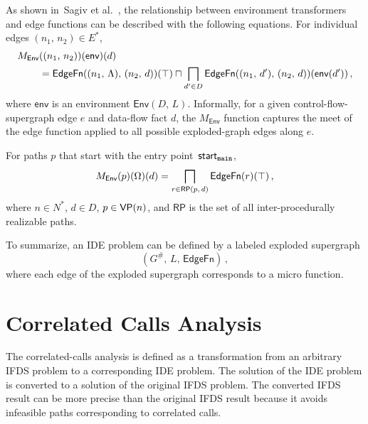 As shown in~Sagiv et al.~\cite{sagiv1996precise}, the relationship between environment transformers and edge functions can be described with the following equations. For individual edges $(n_1,\,n_2)\in E^*$,
\begin{align}\label{eq:envTransToEdgeFnEdge}
  M_\textsf{Env}&((n_1,\,n_2))(\textsf{env})(d)\notag\\
  &=\textsf{EdgeFn}((n_1,\,\Lambda),\,(n_2,\,d))(\top)\sqcap\bigsqcap_{d'\in D}\textsf{EdgeFn}((n_1,\,d'),\,(n_2,\,d))(\textsf{env}(d'))\,,
\end{align}
where $\textsf{env}$ is an environment $\textsf{Env}(D,\,L)$. Informally, for a given control-flow-supergraph edge $e$ and data-flow fact $d$, the $M_\textsf{Env}$ function captures the meet of the edge function applied to all possible exploded-graph edges along $e$.

For paths $p$ that start with the entry point~$\textsf{start}_\texttt{main}$,
\begin{equation}\label{eq:envTransToEdgefn}
  M_\textsf{Env}(p)(\Omega)(d)=\bigsqcap_{r\in\mathsf{RP}(p,\,d)}\textsf{EdgeFn}(r)(\top)\,,
\end{equation}
where $n\in N^*$, $d\in D$, $p\in\textsf{VP}(n)$, and $\mathsf{RP}$ is the set of all inter-procedurally realizable paths.

To summarize, an IDE problem can be defined by a labeled exploded supergraph 
\begin{equation}(G^\#,\,L,\,\mathsf{EdgeFn})\,,\end{equation}
where each edge of the exploded supergraph corresponds to a micro function.


\section{Correlated Calls Analysis}\label{chapter:cca}
The correlated-calls analysis is defined as a transformation from an arbitrary IFDS problem to a corresponding IDE problem. The solution of the IDE problem is converted to a solution of the original IFDS problem. The converted IFDS result can be more precise than the original IFDS result because it avoids infeasible paths corresponding to correlated calls.


